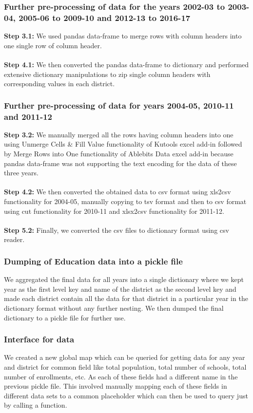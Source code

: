 \documentclass[twoside]{article}
\begin{document}
\subsubsection*{Further pre-processing of data for the years 2002-03 to 2003-04, 2005-06 to 2009-10 and 2012-13 to 2016-17}
\textbf{Step 3.1:} We used pandas data-frame to merge rows with column headers into one single row of column header.\\\\
\textbf{Step 4.1:} We then converted the pandas data-frame to dictionary and performed extensive dictionary manipulations to zip single column headers with corresponding values in each district.

\subsubsection*{Further pre-processing of data for years 2004-05, 2010-11 and 2011-12}
\textbf{Step 3.2:} We manually merged all the rows having column headers into one using Unmerge Cells \& Fill Value functionality of Kutools excel add-in followed by Merge Rows into One functionality of Ablebits Data excel add-in because pandas data-frame was not supporting the text encoding for the data of these three years.\\\\
\textbf{Step 4.2:} We then converted the obtained data to csv format using xls2csv functionality for 2004-05, manually copying to tsv format and then to csv format using cut functionality for 2010-11 and xlsx2csv functionality for 2011-12.\\\\
\textbf{Step 5.2:} Finally, we converted the csv files to dictionary format using csv reader.

\subsubsection*{Dumping of Education data into a pickle file}
We aggregated the final data for all years into a single dictionary where we kept year as the first level key and name of the district as the second level key and made each district contain all the data for that district in a particular year in the dictionary format without any further nesting. We then dumped the final dictionary to a pickle file for further use.

\subsubsection*{Interface for data}
We created a new global map which can be queried for getting data for any year and district for common field like total population, total number of schools, total number of enrollments, etc. As each of these fields had a different name in the previous pickle file. This involved manually mapping each of these fields in different data sets to a common placeholder which can then be used to query just by calling a function.
\end{document}
